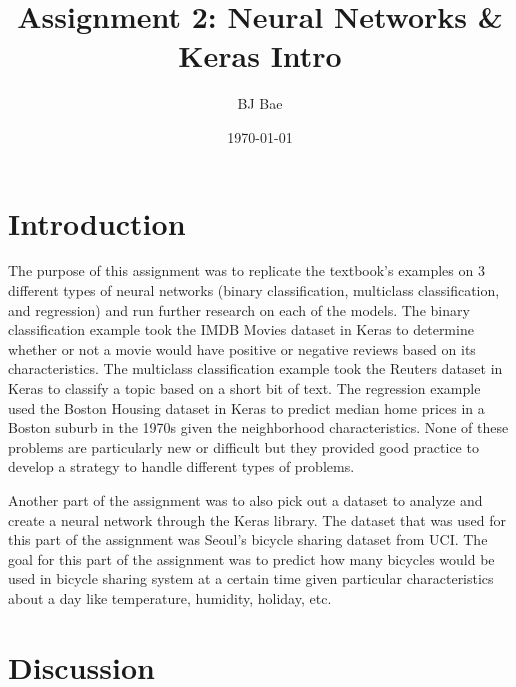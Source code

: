 \documentclass{article}
\title{Assignment 2: Neural Networks \& Keras Intro}
\author{BJ Bae}
\date{\today}
\begin{document}
\maketitle
\tableofcontents

\section{Introduction}
    The purpose of this assignment was to replicate the textbook's examples on 
    3 different types of neural networks (binary classification, 
    multiclass classification, and regression) and run further research on each 
    of the models. The binary classification example took the IMDB Movies dataset
    in Keras to determine whether or not a movie would have positive or negative reviews 
    based on its characteristics. The multiclass classification example took the Reuters dataset
    in Keras to classify a topic based on a short bit of text. The regression example used the 
    Boston Housing dataset in Keras to predict median home prices in a Boston suburb 
    in the 1970s given the neighborhood characteristics. None of these problems are particularly 
    new or difficult but they provided good practice to develop a strategy to handle 
    different types of problems.
    
    Another part of the assignment was to also pick out a dataset to analyze 
    and create a neural network through the Keras library. The dataset that was
    used for this part of the assignment was Seoul's bicycle sharing dataset from UCI.
    The goal for this part of the assignment was to predict how many bicycles would be used in 
    bicycle sharing system at a certain time given particular characteristics about a day like
    temperature, humidity, holiday, etc.


\section{Discussion}
\end{document}
